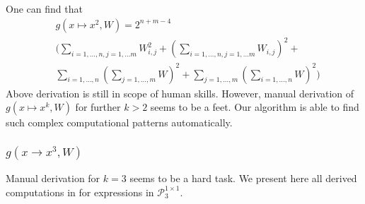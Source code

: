 One can find that 
\begin{align*}
	&g(x \mapsto x^2, W) = 2^{n + m - 4} \\ 
 &\Big(\sum_{i = 1, \dots, n, j = 1, \dots m} W_{i, j}^2 + (\sum_{i = 1, \dots, n, j = 1, \dots m} W_{i, j})^2 + \\
 &\sum_{i = 1, \dots, n}(\sum_{j = 1, \dots, m} W)^2 + \sum_{j = 1, \dots, m}(\sum_{i = 1, \dots, n} W)^2 \Big)
\end{align*}
Above derivation is still in scope of human skills. However, manual derivation
of $g(x \mapsto x^k, W)$ for further $k > 2$  seems to be a feet. Our algorithm
is able to find such complex computational patterns automatically. 

\subsubsection{$g(x \rightarrow x^3, W)$}
Manual derivation for $k = 3$ seems to be a hard task. We present here all derived computations in
for expressions in $\mathcal{P}^{1 \times 1}_3$. 

